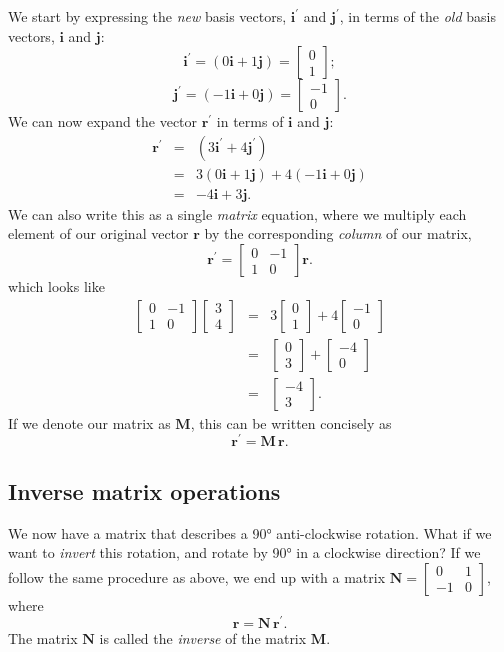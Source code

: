 \documentclass[a4paper]{article}
\newcommand{\bvec}[1]{\mathbf{#1}}
\newcommand{\cvec}[2]{\begin{bmatrix}#1\\#2\end{bmatrix}}
\begin{document}
We start by expressing the \emph{new} basis vectors, $\bvec{i^\prime}$ and $\bvec{j^\prime}$, in terms of the \emph{old} basis vectors, $\bvec{i}$ and $\bvec{j}$:
\begin{equation*}
\bvec{i^\prime} = (0\bvec{i}+1\bvec{j}) = \cvec{0}{1};
\end{equation*}
\begin{equation*}
\bvec{j^\prime} = (-1\bvec{i}+0\bvec{j}) = \cvec{-1}{0}.
\end{equation*}
We can now expand the vector $\bvec{r^\prime}$ in terms of $\bvec{i}$ and $\bvec{j}$:
\begin{eqnarray*}
\bvec{r^\prime}&=&(3\bvec{i^\prime}+4\bvec{j^\prime})\\
               &=&3(0\bvec{i}+1\bvec{j})+4(-1\bvec{i}+0\bvec{j})\\
               &=&-4\bvec{i}+3\bvec{j}.
\end{eqnarray*}
We can also write this as a single \emph{matrix} equation, where we multiply each element of our original vector $\bvec{r}$ by the corresponding \emph{column} of our matrix,
\begin{equation*}
\bvec{r^\prime} = \begin{bmatrix}0 & -1 \\ 1 & 0\end{bmatrix}\bvec{r}.
\end{equation*}
which looks like
\begin{eqnarray*}
\begin{bmatrix}0 & -1 \\ 1 & 0\end{bmatrix}\cvec{3}{4} & = & 3\cvec{0}{1}+4\cvec{-1}{0} \\
  & = & \cvec{0}{3} + \cvec{-4}{0} \\
  & = & \cvec{-4}{3}.
\end{eqnarray*}
If we denote our matrix as $\bvec{M}$, this can be written concisely as
\begin{equation*}
\bvec{r^\prime} = \bvec{M}\,\bvec{r}.
\end{equation*}
\subsection{Inverse matrix operations}
We now have a matrix that describes a \ang{90} anti-clockwise rotation. What if we want to \emph{invert} this rotation, and rotate by \ang{90} in a clockwise direction? If we follow the same procedure as above, we end up with a matrix $\bvec{N}=\begin{bmatrix}0 & 1\\ -1 & 0\end{bmatrix}$, where
\begin{equation*}
\bvec{r} = \bvec{N}\,\bvec{r^\prime}.
\end{equation*}
The matrix $\bvec{N}$ is called the \emph{inverse} of the matrix $\bvec{M}$.
\end{document}
